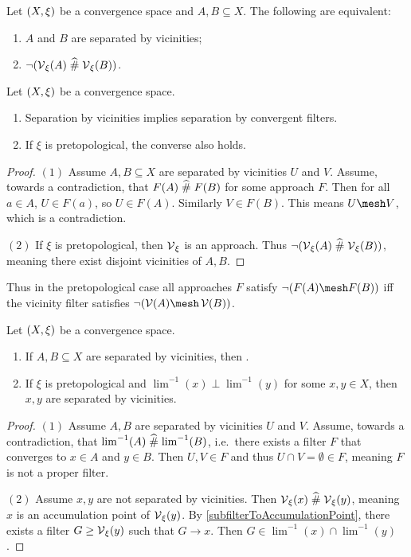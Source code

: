 \begin{lemma}
Let $\sSet{X,\xi}$ be a convergence space and $A,B\subseteq X$. The following are equivalent:
\begin{enumerate}
\item $A$ and $B$ are separated by vicinities;
\item $\neg(\operatorname{\mathcal{V}}_\xi(A)\mathrel{\widehat{\#}} \operatorname{\mathcal{V}}_\xi(B))$.
\end{enumerate}
\end{lemma}

\begin{proposition} \label{disjointVicinitiesConvergentFilterSeparation}
Let $\sSet{X,\xi}$ be a convergence space.
\begin{enumerate}
\item Separation by vicinities implies separation by convergent filters.
\item If $\xi$ is pretopological, the converse also holds.
\end{enumerate}
\end{proposition}
\begin{proof}
$(1)$ Assume $A,B\subseteq X$ are separated by vicinities $U$ and $V$. Assume, towards a contradiction, that $F(A)\mathrel{\widehat{\#}} F(B)$ for some approach $F$. Then for all $a\in A$, $U\in F(a)$, so $U\in F(A)$. Similarly $V\in F(B)$. This means $U\mesh V$, which is a contradiction.

$(2)$ If $\xi$ is pretopological, then $\operatorname{\mathcal{V}}_\xi$ is an approach. Thus $\neg(\operatorname{\mathcal{V}}_\xi(A)\mathrel{\widehat{\#}} \operatorname{\mathcal{V}}_\xi(B))$, meaning there exist disjoint vicinities of $A,B$.
\end{proof}
Thus in the pretopological case all approaches $F$ satisfy $\neg(F(A)\mesh F(B))$ iff the vicinity filter satisfies $\neg(\vicinities(A)\mesh \vicinities(B))$.


\begin{proposition} \label{separationByVicinitiesEquivalences}
Let $\sSet{X,\xi}$ be a convergence space.
\begin{enumerate}
\item If $A,B \subseteq X$ are separated by vicinities, then .
\item If $\xi$ is pretopological and $\lim^{-1}(x)\perp \lim^{-1}(y)$ for some $x,y\in X$, then $x,y$ are separated by vicinities.
\end{enumerate}
\end{proposition}
\begin{proof}
$(1)$ Assume $A,B$ are separated by vicinities $U$ and $V$. Assume, towards a contradiction, that $\lim^{-1}(A)\mathrel{\widehat{\#}} \lim^{-1}(B)$, i.e.\ there exists a filter $F$ that converges to $x\in A$ and $y\in B$. Then $U,V\in F$ and thus $U\cap V = \emptyset \in F$, meaning $F$ is not a proper filter.

$(2)$ Assume $x,y$ are not separated by vicinities. Then $\operatorname{\mathcal{V}}_\xi(x)\mathrel{\widehat{\#}} \operatorname{\mathcal{V}}_\xi(y)$, meaning $x$ is an accumulation point of $\operatorname{\mathcal{V}}_\xi(y)$. By \ref{subfilterToAccumulationPoint}, there exists a filter $G\geq \operatorname{\mathcal{V}}_\xi(y)$ such that $G\to x$. Then $G\in \lim^{-1}(x)\cap \lim^{-1}(y)$.
\end{proof}

